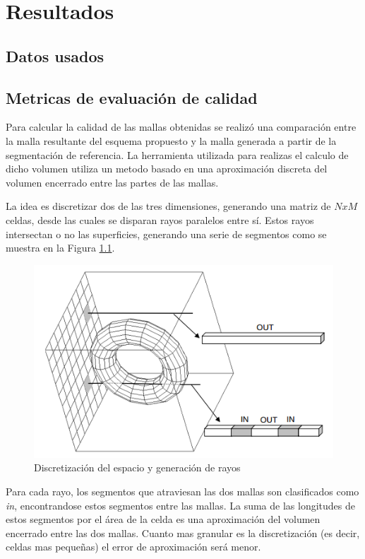 \chapter{Resultados}
\section{Datos usados}
\section{Metricas de evaluación de calidad}
Para calcular la calidad de las mallas obtenidas se realizó una comparación entre la malla resultante del esquema propuesto y la malla generada a partir de la segmentación de referencia. La herramienta utilizada para realizas el calculo de dicho volumen utiliza un metodo basado en una aproximación discreta del volumen encerrado entre las partes de las mallas.

La idea es discretizar dos de las tres dimensiones, generando una matriz de $ N x M $ celdas, desde las cuales se disparan rayos paralelos entre sí. Estos rayos intersectan o no las superficies, generando una serie de segmentos como se muestra en la Figura \ref{fig:discretizacionvolumen}. 

\begin{figure}[h]
\centering
\includegraphics[scale=0.5]{images/disctretizacion.png}
\caption{Discretización del espacio y generación de rayos}
\label{fig:discretizacionvolumen}
\end{figure}

Para cada rayo, los segmentos que atraviesan las dos mallas son clasificados como \emph{in}, encontrandose estos segmentos entre las mallas. La suma de las longitudes de estos segmentos por el área de la celda es una aproximación del volumen encerrado entre las dos mallas. Cuanto mas granular es la discretización (es decir, celdas mas pequeñas) el error de aproximación será menor.

